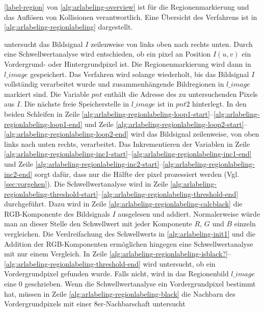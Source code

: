 \autoref{label-region} von \autoref{alg:arlabeling-overview} ist für die Regionenmarkierung und das Auflösen von
 Kollisionen verantwortlich. Eine Übersicht des Verfahrens ist in \autoref{alg:arlabeling-regionlabeling} dargestellt.

  untersucht das Bildsignal $I$ zeilenweise von links oben nach rechts unten. Durch eine
 Schwellwertanalyse wird entschieden, ob ein \gls{pixel} an Position $I(u,v)$ ein Vordergrund- oder Hintergrundpixel
 ist. Die Regionenmarkierung wird dann in $\mathit{l\_image}$ gespeichert. Das Verfahren wird solange wiederholt, bis
 das Bildsignal $I$ vollständig verarbeitet wurde und zusammenhängende Bildregionen in $\mathit{l\_image}$ markiert
 sind. Die Variable $\mathit{pnt}$ enthält die Adresse des zu untersuchenden Pixels aus $I$. Die nächste freie
 Speicherstelle in $\mathit{l\_image}$ ist in $\mathit{pnt2}$ hinterlegt. In den beiden Schleifen in Zeile
 \ref{alg:arlabeling-regionlabeling-loop1-start}--\ref{alg:arlabeling-regionlabeling-loop1-end} und Zeile
 \ref{alg:arlabeling-regionlabeling-loop2-start}--\ref{alg:arlabeling-regionlabeling-loop2-end} wird das Bildsignal
 zeilenweise, von oben links nach unten rechts, verarbeitet. Das Inkrementieren der Variablen in Zeile
 \ref{alg:arlabeling-regionlabeling-inc1-start}--\ref{alg:arlabeling-regionlabeling-inc1-end} und Zeile
 \ref{alg:arlabeling-regionlabeling-inc2-start}--\ref{alg:arlabeling-regionlabeling-inc2-end} sorgt dafür, dass nur die
 Hälfte der \gls{pixel} prozessiert werden (Vgl. \autoref{sec:vorgehen}). Die Schwellwertanalyse wird in Zeile
 \ref{alg:arlabeling-regionlabeling-threshold-start}--\ref{alg:arlabeling-regionlabeling-threshold-end} durchgeführt.
 Dazu wird in Zeile \ref{alg:arlabeling-regionlabeling-calcblack} die RGB-Komponente des Bildsignals $I$ ausgelesen und
 addiert. Normalerweise würde man an dieser Stelle den Schwellwert mit jeder Komponente $R$, $G$ und $B$ einzeln
 vergleichen. Die Verdreifachung des Schwellwerts in \autoref{alg:arlabeling-init1} und die Addition der
 RGB-Komponenten ermöglichen hingegen eine Schwellwertanalyse mit nur einem Vergleich.\label{sub:arlabel-threshold} In
 Zeile \ref{alg:arlabeling-regionlabeling-isblack?}--\ref{alg:arlabeling-regionlabeling-threshold-end} wird
 untersucht, ob ein Vordergrundpixel gefunden wurde. Falls nicht, wird in das Regionenbild $\mathit{l\_image}$ eine $0$
 geschrieben. Wenn die Schwellwertanalyse ein Vordergrundpixel bestimmt hat, müssen in Zeile
 \ref{alg:arlabeling-regionlabeling-black} die Nachbarn des Vordergrundpixels mit einer 8er-Nachbarschaft untersucht
